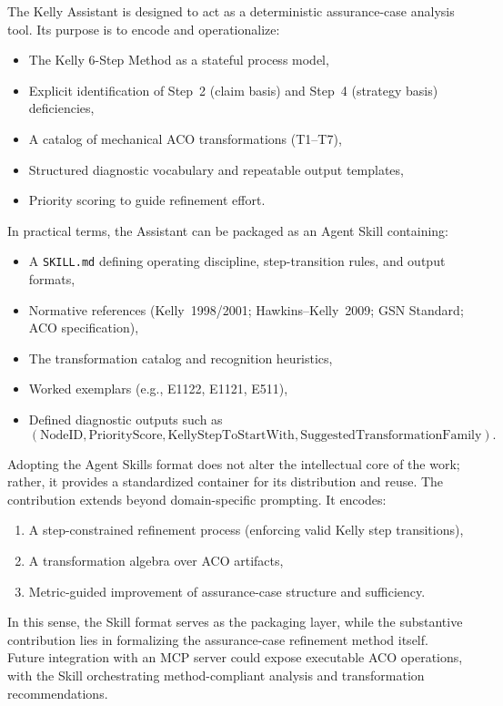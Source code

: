 \documentclass[12pt,twoside,a4paper]{article}
\begin{document}
The Kelly Assistant is designed to act as a deterministic assurance-case analysis tool. Its purpose is to encode and operationalize:

\begin{itemize}
  \item The Kelly 6-Step Method as a stateful process model,
  \item Explicit identification of Step~2 (claim basis) and Step~4 (strategy basis) deficiencies,
  \item A catalog of mechanical ACO transformations (T1--T7),
  \item Structured diagnostic vocabulary and repeatable output templates,
  \item Priority scoring to guide refinement effort.
\end{itemize}

In practical terms, the Assistant can be packaged as an Agent Skill containing:

\begin{itemize}
  \item A \texttt{SKILL.md} defining operating discipline, step-transition rules, and output formats,
  \item Normative references (Kelly~1998/2001; Hawkins--Kelly~2009; GSN Standard; ACO specification),
  \item The transformation catalog and recognition heuristics,
  \item Worked exemplars (e.g., E1122, E1121, E511),
  \item Defined diagnostic outputs such as
  \[
    (\text{NodeID}, \text{PriorityScore}, \text{KellyStepToStartWith}, \text{SuggestedTransformationFamily}).
  \]
\end{itemize}

Adopting the Agent Skills format does not alter the intellectual core of the work; rather, it provides a standardized container for its distribution and reuse. The contribution extends beyond domain-specific prompting. It encodes:

\begin{enumerate}
  \item A step-constrained refinement process (enforcing valid Kelly step transitions),
  \item A transformation algebra over ACO artifacts,
  \item Metric-guided improvement of assurance-case structure and sufficiency.
\end{enumerate}

In this sense, the Skill format serves as the packaging layer, while the substantive contribution lies in formalizing the assurance-case refinement method itself. Future integration with an MCP server could expose executable ACO operations, with the Skill orchestrating method-compliant analysis and transformation recommendations.
\end{document}
